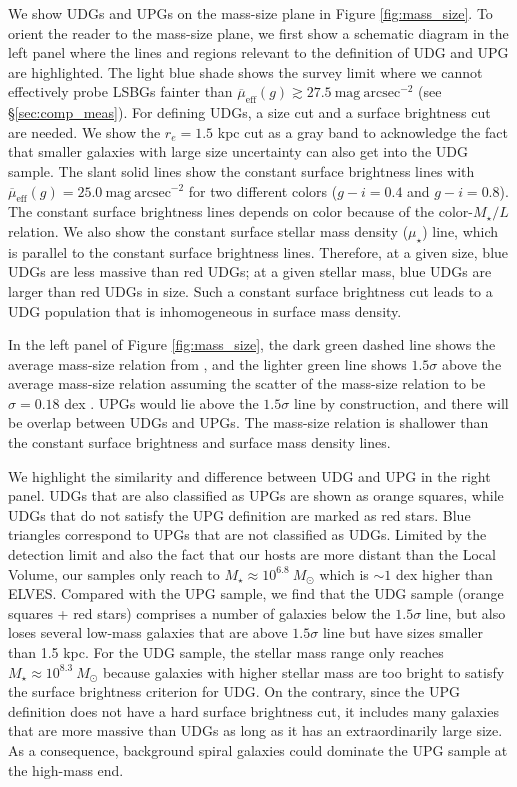 \documentclass[twocolumn,astrosymb,twocolappendix]{aastex631}
\newcommand{\sbunit}{\mathrm{mag\ arcsec}^{-2}}
\newcommand{\sbeff}{\overline{\mu}_{\mathrm{eff}}(g)}
\begin{document}
\begin{CJK*}{UTF8}{gbsn}
We show UDGs and UPGs on the mass-size plane in Figure \ref{fig:mass_size}. To orient the reader to the mass-size plane, we first show a schematic diagram in the left panel where the lines and regions relevant to the definition of UDG and UPG are highlighted. The light blue shade shows the survey limit where we cannot effectively probe LSBGs fainter than $\sbeff \gtrsim 27.5\ \sbunit$ (see \S\ref{sec:comp_meas}). 
For defining UDGs, a size cut and a surface brightness cut are needed. We show the $r_e = 1.5$ kpc cut as a gray band to acknowledge the fact that smaller galaxies with large size uncertainty can also get into the UDG sample. The slant solid lines show the constant surface brightness lines with $\sbeff = 25.0\ \sbunit$ for two different colors ($g-i=0.4$ and $g-i=0.8$). The constant surface brightness lines depends on color because of the color-$M_\star/L$ relation. We also show the constant surface stellar mass density ($\mu_\star$) line, which is parallel to the constant surface brightness lines. Therefore, at a given size, blue UDGs are less massive than red UDGs; at a given stellar mass, blue UDGs are larger than red UDGs in size. Such a constant surface brightness cut leads to a UDG population that is inhomogeneous in surface mass density. 

In the left panel of Figure \ref{fig:mass_size}, the dark green dashed line shows the average mass-size relation from \citep{ELVES-I}, and the lighter green line shows $1.5\sigma$ above the average mass-size relation assuming the scatter of the mass-size relation to be $\sigma=0.18$ dex \citep{ELVES-I}. UPGs would lie above the $1.5\sigma$ line by construction, and there will be overlap between UDGs and UPGs. The mass-size relation is shallower than the constant surface brightness and surface mass density lines.

We highlight the similarity and difference between UDG and UPG in the right panel. UDGs that are also classified as UPGs are shown as orange squares, while UDGs that do not satisfy the UPG definition are marked as red stars. Blue triangles correspond to UPGs that are not classified as UDGs. Limited by the detection limit and also the fact that our hosts are more distant than the Local Volume, our samples only reach to $M_\star \approx 10^{6.8}\ M_\odot$ which is $\sim 1$ dex higher than ELVES. 
Compared with the UPG sample, we find that the UDG sample (orange squares + red stars) comprises a number of galaxies below the $1.5\sigma$ line, but also loses several low-mass galaxies that are above $1.5\sigma$ line but have sizes smaller than 1.5 kpc. For the UDG sample, the stellar mass range only reaches $M_\star\approx 10^{8.3}\ M_\odot$ because galaxies with higher stellar mass are too bright to satisfy the surface brightness criterion for UDG. On the contrary, since the UPG definition does not have a hard surface brightness cut, it includes many galaxies that are more massive than UDGs as long as it has an extraordinarily large size. As a consequence, background spiral galaxies could dominate the UPG sample at the high-mass end. 


\end{CJK*}
\end{document}
